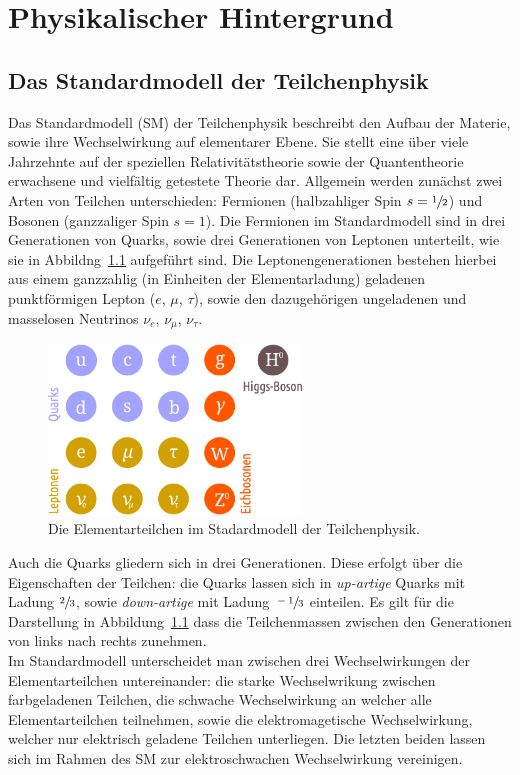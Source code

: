 \chapter{Physikalischer Hintergrund}
\label{chap:2}
%
\section{Das Standardmodell der Teilchenphysik}
%
Das Standardmodell (SM) der Teilchenphysik beschreibt den Aufbau der Materie, sowie ihre Wechselwirkung auf elementarer Ebene. Sie stellt eine über viele Jahrzehnte auf der speziellen Relativitätstheorie sowie der Quantentheorie erwachsene und vielfältig getestete Theorie dar. Allgemein werden zunächst zwei Arten von Teilchen unterschieden: Fermionen (halbzahliger Spin $s=\sfrac{1}{2}$) und Bosonen (ganzzaliger Spin $s=1$). Die Fermionen im Standardmodell sind in drei Generationen von Quarks, sowie drei Generationen von Leptonen unterteilt, wie sie in Abbildng~\ref{fig:particles} aufgeführt sind. Die Leptonengenerationen bestehen hierbei aus einem ganzzahlig (in Einheiten der Elementarladung) geladenen punktförmigen Lepton ($e$, $\mu$, $\tau$), sowie den dazugehörigen ungeladenen und masselosen Neutrinos $\nu_e$, $\nu_\mu$, $\nu_\tau$.
%
\begin{figure}
  \centering
      \includegraphics[width=0.6\textwidth]{Plots/SM.pdf}
  \caption{Die Elementarteilchen im Stadardmodell der Teilchenphysik.}
  \label{fig:particles}
\end{figure}
%
Auch die Quarks gliedern sich in drei Generationen. Diese erfolgt über die Eigenschaften der Teilchen: die Quarks lassen sich in \textit{up-artige} Quarks mit Ladung $\sfrac{2}{3}$, sowie \textit{down-artige} mit Ladung $\sfrac{-1}{3}$ einteilen. Es gilt für die Darstellung in Abbildung~\ref{fig:particles} dass die Teilchenmassen zwischen den Generationen von links nach rechts zunehmen.\\
Im Standardmodell unterscheidet man zwischen drei Wechselwirkungen der Elementarteilchen untereinander: die starke Wechselwrikung zwischen farbgeladenen Teilchen, die schwache Wechselwirkung an welcher alle Elementarteilchen teilnehmen, sowie die elektromagetische Wechselwirkung, welcher nur elektrisch geladene Teilchen unterliegen. Die letzten beiden lassen sich im Rahmen des SM zur elektroschwachen Wechselwirkung vereinigen.

